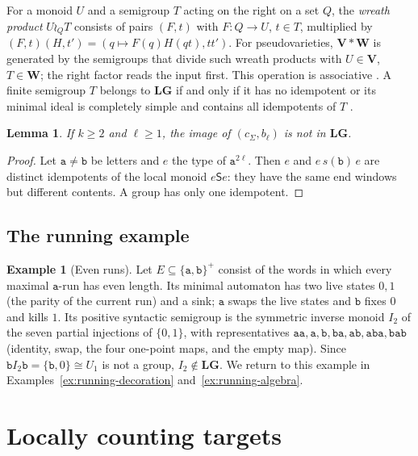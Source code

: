 \documentclass[11pt]{article}
\numberwithin{equation}{section}
\theoremstyle{plain}
\newtheorem{lemma}[theorem]{Lemma}
\theoremstyle{definition}
\newtheorem{example}[theorem]{Example}
\theoremstyle{remark}
\theoremstyle{plain}
\newcommand{\LG}{\mathbf{LG}}
\begin{document}
For a monoid $U$ and a semigroup $T$ acting on the right on a set $Q$, the
\emph{wreath product} $U\wr_QT$ consists of pairs $(F,t)$ with $F:Q\to U$,
$t\in T$, multiplied by $(F,t)(H,t')=(q\mapsto F(q)H(qt),tt')$.  For
pseudovarieties, $\mathbf V*\mathbf W$ is generated by the semigroups that divide
such wreath products with $U\in\mathbf V$, $T\in\mathbf W$; the right factor
reads the input first.  This operation is associative \cite{Tilson1987}.
A finite semigroup $T$ belongs to $\LG$ if and only if it has no idempotent or
its minimal ideal is completely simple and contains all idempotents of $T$
\cite[Prop.~2.1]{CostaNogueiraTeixeira2021}.

\begin{lemma}
\label{lem:window-not-lg}
If $k\ge2$ and $\ell\ge1$, the image of $(c_\Sigma,b_\ell)$ is not in $\LG$.
\end{lemma}

\begin{proof}
Let $\mathtt a\ne\mathtt b$ be letters and $e$ the type of $\mathtt a^{2\ell}$.
Then $e$ and $e\,s(\mathtt b)\,e$ are distinct idempotents of the local monoid
$e\mathsf Se$: they have the same end windows but different contents.  A group
has only one idempotent.
\end{proof}

\subsection{The running example}

\begin{example}[Even runs]
\label{ex:running}
Let $E\subseteq\{\mathtt a,\mathtt b\}^+$ consist of the words in which every
maximal $\mathtt a$-run has even length.  Its minimal automaton has two live
states $0,1$ (the parity of the current run) and a sink; $\mathtt a$ swaps the
live states and $\mathtt b$ fixes $0$ and kills $1$.  Its positive syntactic
semigroup is the symmetric inverse monoid $I_2$ of the seven partial injections
of $\{0,1\}$, with representatives
$\mathtt{aa},\mathtt a,\mathtt b,\mathtt{ba},\mathtt{ab},\mathtt{aba},\mathtt{bab}$
(identity, swap, the four one-point maps, and the empty map).  Since $\mathtt
bI_2\mathtt b=\{\mathtt b,0\}\cong U_1$ is not a group, $I_2\notin\LG$.  We
return to this example in Examples~\ref{ex:running-decoration}
and~\ref{ex:running-algebra}.
\end{example}

\section{Locally counting targets}
\label{sec:L}
\end{document}
